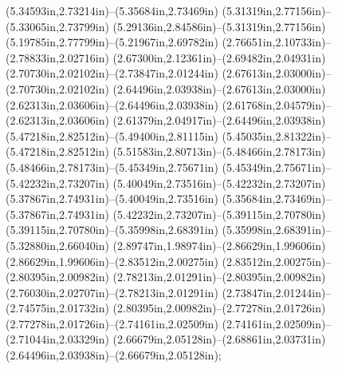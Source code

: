 (5.34593in,2.73214in)--(5.35684in,2.73469in) (5.31319in,2.77156in)--(5.33065in,2.73799in) (5.29136in,2.84586in)--(5.31319in,2.77156in) (5.19785in,2.77799in)--(5.21967in,2.69782in) (2.76651in,2.10733in)--(2.78833in,2.02716in) (2.67300in,2.12361in)--(2.69482in,2.04931in) (2.70730in,2.02102in)--(2.73847in,2.01244in) (2.67613in,2.03000in)--(2.70730in,2.02102in) (2.64496in,2.03938in)--(2.67613in,2.03000in) (2.62313in,2.03606in)--(2.64496in,2.03938in) (2.61768in,2.04579in)--(2.62313in,2.03606in) (2.61379in,2.04917in)--(2.64496in,2.03938in) (5.47218in,2.82512in)--(5.49400in,2.81115in) (5.45035in,2.81322in)--(5.47218in,2.82512in) (5.51583in,2.80713in)--(5.48466in,2.78173in) (5.48466in,2.78173in)--(5.45349in,2.75671in) (5.45349in,2.75671in)--(5.42232in,2.73207in) (5.40049in,2.73516in)--(5.42232in,2.73207in) (5.37867in,2.74931in)--(5.40049in,2.73516in) (5.35684in,2.73469in)--(5.37867in,2.74931in) (5.42232in,2.73207in)--(5.39115in,2.70780in) (5.39115in,2.70780in)--(5.35998in,2.68391in) (5.35998in,2.68391in)--(5.32880in,2.66040in) (2.89747in,1.98974in)--(2.86629in,1.99606in) (2.86629in,1.99606in)--(2.83512in,2.00275in) (2.83512in,2.00275in)--(2.80395in,2.00982in) (2.78213in,2.01291in)--(2.80395in,2.00982in) (2.76030in,2.02707in)--(2.78213in,2.01291in) (2.73847in,2.01244in)--(2.74575in,2.01732in) (2.80395in,2.00982in)--(2.77278in,2.01726in) (2.77278in,2.01726in)--(2.74161in,2.02509in) (2.74161in,2.02509in)--(2.71044in,2.03329in) (2.66679in,2.05128in)--(2.68861in,2.03731in) (2.64496in,2.03938in)--(2.66679in,2.05128in);
